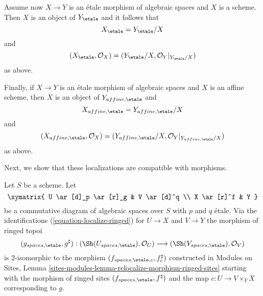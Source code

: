 \medskip\noindent
Assume now $X \to Y$ is an \'etale morphism of algebraic spaces and $X$ is
a scheme. Then $X$ is an object of $Y_\etale$ and it follows that
\begin{equation}
\label{equation-localize-at-scheme}
X_\etale = Y_\etale/X
\end{equation}
and
\begin{equation}
\label{equation-localize-at-scheme-ringed}
(X_\etale, \mathcal{O}_X) =
(Y_\etale/X, \mathcal{O}_Y|_{Y_\etale/X})
\end{equation}
as above.

\medskip\noindent
Finally, if $X \to Y$ is an \'etale morphism of algebraic spaces and $X$ is
an affine scheme, then $X$ is an object of $Y_{affine, \etale}$ and
\begin{equation}
\label{equation-localize-at-affine}
X_{affine, \etale} = Y_{affine, \etale}/X
\end{equation}
and
\begin{equation}
\label{equation-localize-at-affine-ringed}
(X_{affine, \etale}, \mathcal{O}_X) =
(Y_{affine, \etale}/X, \mathcal{O}_Y|_{Y_{affine, \etale}/X})
\end{equation}
as above.

\medskip\noindent
Next, we show that these localizations are compatible with morphisms.

\begin{lemma}
\label{lemma-relocalize-morphism}
Let $S$ be a scheme. Let
$$
\xymatrix{
U \ar[d]_p \ar[r]_g & V \ar[d]^q \\
X \ar[r]^f & Y
}
$$
be a commutative diagram of algebraic spaces over $S$ with $p$ and $q$ \'etale.
Via the identifications
(\ref{equation-localize-ringed}) for $U \to X$ and $V \to Y$
the morphism of ringed topoi
$$
(g_{spaces, \etale}, g^\sharp) :
(\Sh(U_{spaces, \etale}), \mathcal{O}_U)
\longrightarrow
(\Sh(V_{spaces, \etale}), \mathcal{O}_V)
$$
is $2$-isomorphic to the morphism $(f_{spaces, \etale, c}, f_c^\sharp)$
constructed in
Modules on Sites,
Lemma \ref{sites-modules-lemma-relocalize-morphism-ringed-sites}
starting with the morphism of ringed sites
$(f_{spaces, \etale}, f^\sharp)$ and
the map $c : U \to V \times_Y X$ corresponding to $g$.
\end{lemma}


